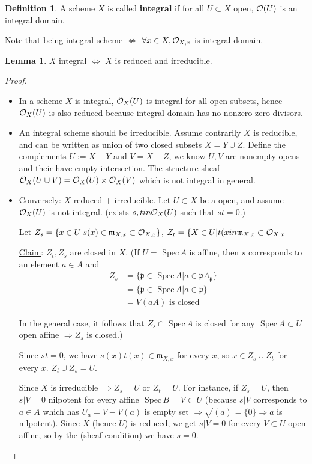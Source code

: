 \documentclass[11pt]{article}
\theoremstyle{definition}
\newtheorem{lemma}[thm]{Lemma}
\newtheorem{dfn}[thm]{Definition}
\newcommand{\spec}{\text{ Spec}\,}
\newcommand{\scm}{{\mathfrak m}}
\newcommand{\scp}{{\mathfrak p}}
\newcommand{\calo}{{\cal O}}
\newcommand{\Lrta}{\Longrightarrow}
\newcommand{\Llrta}{\Longleftrightarrow}
\begin{document}
\begin{dfn}
A scheme $X$ is called \textbf{integral} if for all $U\subset X$ open, $\calo(U)$ is an integral domain.
\end{dfn}
Note that being integral scheme $\not \Leftrightarrow$ $\forall x\in X,\calo_{X,x} $ is integral domain.
\begin{lemma}
$X$ integral $\Llrta$ $X$ is reduced and irreducible.
\end{lemma}
\begin{proof}\ 
\begin{itemize}
\item In a scheme $X$ is integral, $\calo_X(U)$ is integral for all open subsets, hence $\calo_X(U)$ is also reduced because integral domain has no nonzero zero divisors.

\item An integral scheme should be irreducible. Assume contrarily $X$ is reducible, and can be written as union of two closed subsets $X=Y\cup Z$. Define the complements $U:=X-Y$ and $V=X-Z$, we know $U,V$ are nonempty opens and their have empty intersection. The structure sheaf $\calo_X(U\cup V)=\calo_X(U)\times \calo_X(V)$ which is not integral in general.
\item Conversely: $X$ reduced + irreducible. Let $U\subset X$ be a open, and assume $\calo_X(U)$ is not integral. (exists $s,tin\calo_X(U)$ such that $st=0$.)

Let $Z_s=\{x\in U| s(x)\in\scm_{X,x}\subset \calo_{X,x}\}$, $Z_t=\{X\in U|t(x\\in\scm_{X,x}\subset \calo_{X,x}$

\underline{Claim}: $Z_t,Z_s$ are closed in $X$. (If $U=\spec A$ is affine, then $s$ corresponds to an element $a\in A$ and
$$
\begin{aligned}
Z_s&=\{\scp\in\spec A| a\in\scp A_\scp\}\\
&=\{\scp\in\spec A|a\in\scp\}\\
&=V(a A)\text{ is  closed}
\end{aligned}
$$

In the general case, it follows that $Z_s\cap \spec A$ is closed for any $\spec A\subset U$ open affine $\Lrta Z_s$ is closed.)

Since $st=0$, we have $s(x)t(x)\in\scm_{X,x}$ for every $x$, so $x\in Z_s\cup Z_t$ for every $x$. $Z_t\cup Z_s=U$.

Since $X$ is irreducible $\Lrta Z_s=U$ or $Z_t=U$. For instance, if $Z_s=U$, then $s|V=0$ nilpotent for every affine $\spec B=V\subset U$ (because $s|V$ corresponds to $a\in A$ which has $U_a=V-V(a)$ is empty set $\Lrta \sqrt{(a)}=\{0\}\Lrta a$ is nilpotent). Since $X$ (hence $U$) is reduced, we get $s|V=0$ for every $V\subset U$ open affine, so by the (sheaf condition) we have $s=0$.
\end{itemize}
\end{proof}
\end{document}
